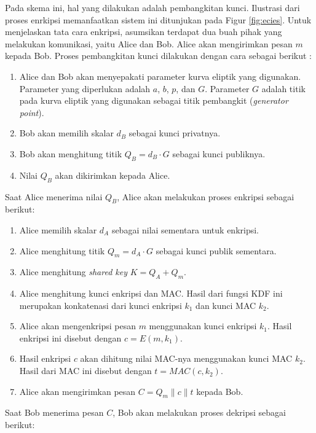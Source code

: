 \documentclass[conference]{IEEEtran}
\begin{document}
Pada skema ini, hal yang dilakukan adalah pembangkitan kunci. Ilustrasi dari proses enrkipsi memanfaatkan sistem ini ditunjukan pada Figur \ref{fig:ecies}. Untuk menjelaskan tata cara enkripsi, asumsikan terdapat dua buah pihak yang melakukan komunikasi, yaitu Alice dan Bob. Alice akan mengirimkan pesan $m$ kepada Bob. Proses pembangkitan kunci dilakukan dengan cara sebagai berikut \cite{b2}:

\begin{enumerate}
    \item Alice dan Bob akan menyepakati parameter kurva eliptik yang digunakan. Parameter yang diperlukan adalah $a$, $b$, $p$, dan $G$. Parameter $G$ adalah titik pada kurva eliptik yang digunakan sebagai titik pembangkit (\emph{generator point}).
    \item Bob akan memilih skalar $d_B$ sebagai kunci privatnya.
    \item Bob akan menghitung titik $Q_B = d_B \cdot G$ sebagai kunci publiknya.
    \item Nilai $Q_B$ akan dikirimkan kepada Alice.
\end{enumerate}

Saat Alice menerima nilai $Q_B$, Alice akan melakukan proses enkripsi sebagai berikut:

\begin{enumerate}
    \item Alice memilih skalar $d_A$ sebagai nilai sementara untuk enkripsi.
    \item Alice menghitung titik $Q_m = d_A \cdot G$ sebagai kunci publik sementara.
    \item Alice menghitung \emph{shared key} $K = Q_A + Q_m$.
    \item Alice menghitung kunci enkripsi dan MAC. Hasil dari fungsi KDF ini merupakan konkatenasi dari kunci enkripsi $k_1$ dan kunci MAC $k_2$. 
    \item Alice akan mengenkripsi pesan $m$ menggunakan kunci enkripsi $k_1$. Hasil enkripsi ini disebut dengan $c = E(m, k_1)$.
    \item Hasil enkripsi $c$ akan dihitung nilai MAC-nya menggunakan kunci MAC $k_2$. Hasil dari MAC ini disebut dengan $t = MAC(c, k_2)$.
    \item Alice akan mengirimkan pesan $C = Q_m \parallel c \parallel t$ kepada Bob.
\end{enumerate}

Saat Bob menerima pesan $C$, Bob akan melakukan proses dekripsi sebagai berikut:
\end{document}

